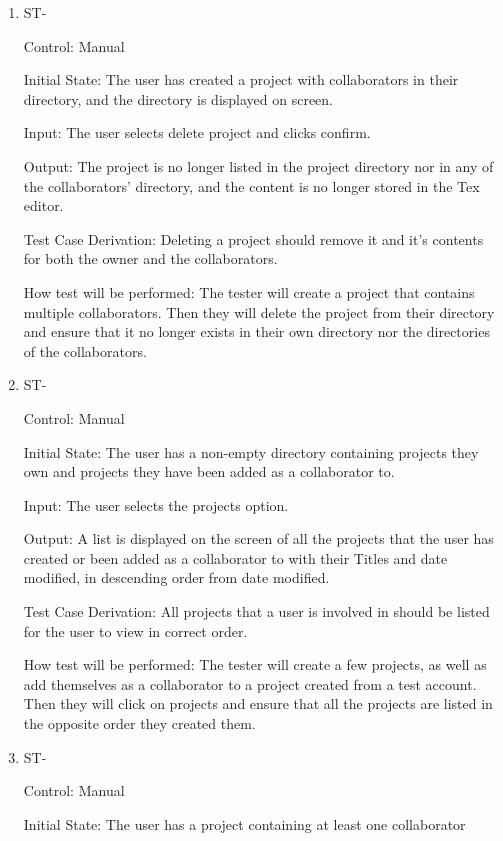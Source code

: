 \documentclass[12pt, titlepage]{article}
\newcounter{TESTID}
\newcommand\TESTNUM{\stepcounter{TESTID}\theTESTID}
\begin{document}
\begin{enumerate}
		\item{ST-\TESTNUM\\}
		
		Control: Manual
		
		Initial State: The user has created a project with collaborators in their directory, and the directory is displayed on screen.
		
		Input: The user selects delete project and clicks confirm.
		
		Output: The project is no longer listed in the project directory nor in any of the collaborators' directory, and the content is no longer stored in the Tex editor.
		
		Test Case Derivation: Deleting a project should remove it and it's contents for both the owner and the collaborators.
		
		How test will be performed: The tester will create a project that contains multiple collaborators. Then they will delete the project from their directory and ensure that it no longer exists in their own directory nor the directories of the collaborators.
		
		\item{ST-\TESTNUM\\}
		
		Control: Manual
		
		Initial State: The user has a non-empty directory containing projects they own and projects they have been added as a collaborator to.
		
		Input: The user selects the projects option. 
		
		Output: A list is displayed on the screen of all the projects that the user has created or been added as a collaborator to with their Titles and date modified, in descending order from date modified.
		
		Test Case Derivation: All projects that a user is involved in should be listed for the user to view in correct order.
		
		How test will be performed: The tester will create a few projects, as well as add themselves as a collaborator to a project created from a test account. Then they will click on projects and ensure that all the projects are listed in the opposite order they created them.
		
		\item{ST-\TESTNUM\\}
		
		Control: Manual
		
		Initial State: The user has a project containing at least one collaborator
		

\end{enumerate}
\end{document}
